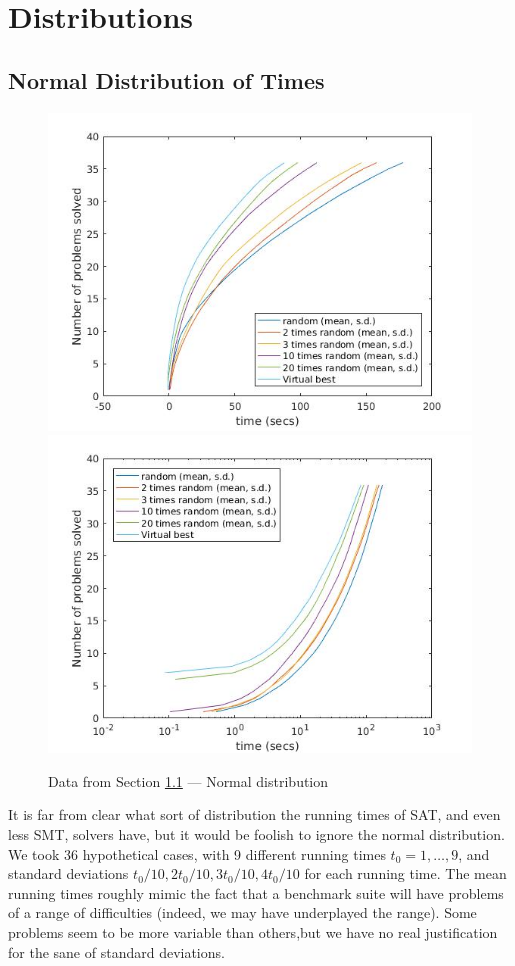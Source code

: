 \documentclass{easychair}
\begin{document}
\section{Distributions}
\subsection{Normal Distribution of Times}\label{sec:Normal}
\begin{figure}[h]
\caption{Data from Section \ref{sec:Normal} --- Normal distribution\label{Fig:Normal}}
\includegraphics[scale=0.4]{RSolve20.jpg}
\includegraphics[scale=0.4]{RlogSolve20.jpg}
\end{figure}
It is far from clear what sort of distribution the running times of SAT, and even less SMT, solvers have, but it would be foolish to ignore the normal distribution. We took 36 hypothetical cases, with 9 different running times $t_0=1,\ldots,9$, and standard deviations $t_0/10,2t_0/10,3t_0/10,4t_0/10$ for each running time. The mean running times roughly mimic the fact that a benchmark suite will have problems of a range of difficulties (indeed, we may have underplayed the range). Some problems seem to be more variable than others,but we have no real justification for the sane of standard deviations.
\end{document}
